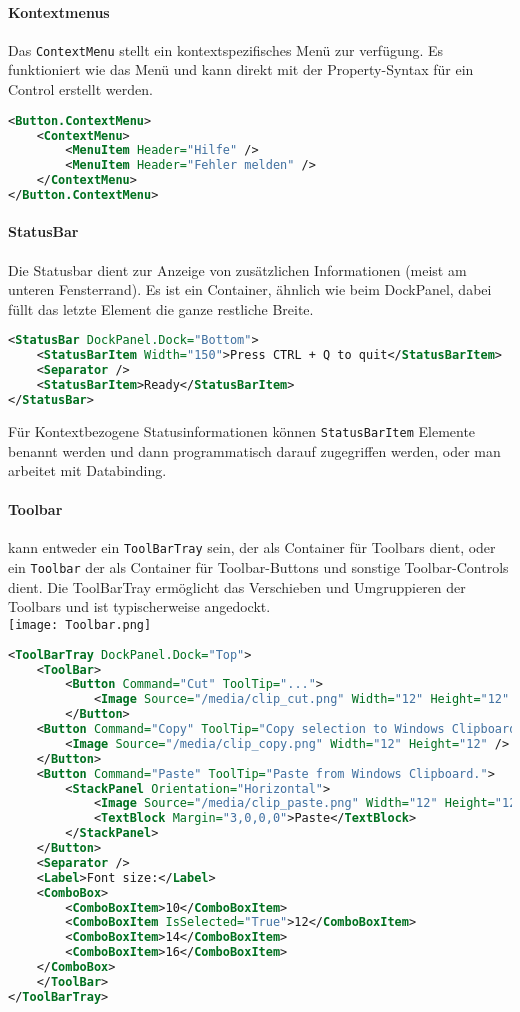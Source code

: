 \paragraph{Kontextmenus} Das \verb+ContextMenu+ stellt ein kontextspezifisches Menü zur verfügung. Es funktioniert wie das Menü und kann direkt mit der Property-Syntax für ein Control erstellt werden.
\begin{lstlisting}[language=xml]
<Button.ContextMenu>
    <ContextMenu>
        <MenuItem Header="Hilfe" />
        <MenuItem Header="Fehler melden" />
    </ContextMenu>
</Button.ContextMenu>
\end{lstlisting}
\paragraph{StatusBar} Die Statusbar dient zur Anzeige von zusätzlichen Informationen (meist am unteren Fensterrand). Es ist ein Container, ähnlich wie beim DockPanel, dabei füllt das letzte Element die ganze restliche Breite.
\begin{lstlisting}[language=xml]
<StatusBar DockPanel.Dock="Bottom">
    <StatusBarItem Width="150">Press CTRL + Q to quit</StatusBarItem>
    <Separator />
    <StatusBarItem>Ready</StatusBarItem>
</StatusBar>
\end{lstlisting}
Für Kontextbezogene Statusinformationen können \verb+StatusBarItem+ Elemente benannt werden und dann programmatisch darauf zugegriffen werden, oder man arbeitet mit Databinding.
\paragraph{Toolbar} kann entweder ein \verb+ToolBarTray+ sein, der als Container für Toolbars dient, oder ein \verb+Toolbar+ der als Container für Toolbar-Buttons und sonstige Toolbar-Controls dient. Die ToolBarTray ermöglicht das Verschieben und Umgruppieren der Toolbars und ist typischerweise angedockt. \\
\texttt{[image: Toolbar.png]}
\begin{lstlisting}[language=xml]
<ToolBarTray DockPanel.Dock="Top">
    <ToolBar>
        <Button Command="Cut" ToolTip="...">
            <Image Source="/media/clip_cut.png" Width="12" Height="12" />
        </Button>
    <Button Command="Copy" ToolTip="Copy selection to Windows Clipboard.">
        <Image Source="/media/clip_copy.png" Width="12" Height="12" />
    </Button>
    <Button Command="Paste" ToolTip="Paste from Windows Clipboard.">
        <StackPanel Orientation="Horizontal">
            <Image Source="/media/clip_paste.png" Width="12" Height="12" />
            <TextBlock Margin="3,0,0,0">Paste</TextBlock>
        </StackPanel>
    </Button>
    <Separator />
    <Label>Font size:</Label>
    <ComboBox>
        <ComboBoxItem>10</ComboBoxItem>
        <ComboBoxItem IsSelected="True">12</ComboBoxItem>
        <ComboBoxItem>14</ComboBoxItem>
        <ComboBoxItem>16</ComboBoxItem>
    </ComboBox>
    </ToolBar>
</ToolBarTray>
\end{lstlisting}
